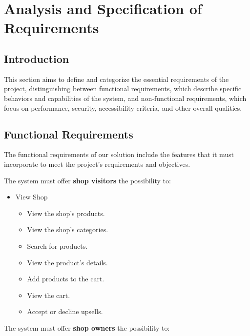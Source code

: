 \chapter{Analysis and Specification of Requirements}
\setcounter{minitocdepth}{1}
\minitoc
\newpage
\section{Introduction}
This section aims to define and categorize the essential requirements of the project, distinguishing between functional requirements, which describe specific behaviors and capabilities of the system, and non-functional requirements, which focus on performance, security, accessibility criteria, and other overall qualities.

\section{Functional Requirements}
The functional requirements of our solution include the features that it must incorporate to meet the project's requirements and objectives. 
\newline

The system must offer \textbf{shop visitors} the possibility to:

\begin{itemize}
    \item View Shop
    \begin{itemize}
        \item View the shop's products.
        \item View the shop's categories.
        \item Search for products.
        \item View the product's details.
        \item Add products to the cart.
        \item View the cart.
        \item Accept or decline upsells.
    \end{itemize}
\end{itemize}

The system must offer \textbf{shop owners} the possibility to:

